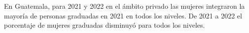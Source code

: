 En Guatemala, para 2021 y 2022 en el ámbito privado las mujeres integraron la mayoría de personas graduadas en 2021 en todos los niveles. De 2021 a 2022 el porcentaje de mujeres graduadas disminuyó para todos los niveles. 